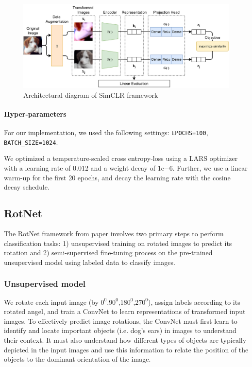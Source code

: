 \begin{figure}[!htbp]
    \centering
    \includegraphics[width=1\linewidth]{figs/archDiag_SimCLR.png}
    \caption{Architectural diagram of SimCLR framework}
    \label{fig:archDiag_SimCLR}
\end{figure}

\paragraph{Hyper-parameters} For our implementation, we used the following settings: \texttt{EPOCHS=100}, \texttt{BATCH\_SIZE=1024}.

We optimized a temperature-scaled cross entropy-loss using a LARS optimizer with a learning rate of 0.012 and a weight decay of $1\mathrm{e}{-6}$. Further, we use a linear warm-up for the first 20 epochs, and decay the learning rate with the cosine decay schedule.

\subsection{RotNet}

The RotNet framework from paper \cite{RotNet} involves two primary steps to perform classification tasks: 1) unsupervised training on rotated images to predict its rotation and 2) semi-supervised fine-tuning process on the pre-trained unsupervised model using labeled data to classify images.

\subsubsection{Unsupervised model}

We rotate each input image (by $0^0$,$90^0$,$180^0$,$270^0$), assign labels according to its rotated angel, and train a ConvNet to learn representations of transformed input images. To effectively predict image rotations, the ConvNet must first learn to identify and locate important objects (i.e. dog's ears) in images to understand their context. It must also understand how different types of objects are typically depicted in the input images and use this information to relate the position of the objects to the dominant orientation of the image.

